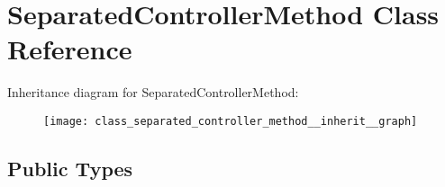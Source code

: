 \hypertarget{class_separated_controller_method}{\section{\-Separated\-Controller\-Method \-Class \-Reference}
\label{class_separated_controller_method}
}


\-Inheritance diagram for \-Separated\-Controller\-Method\-:\nopagebreak
\begin{figure}[H]
\begin{center}
\leavevmode
\texttt{[image: class\_separated\_controller\_method\_\_inherit\_\_graph]}
\end{center}
\end{figure}
\subsection*{\-Public \-Types}
